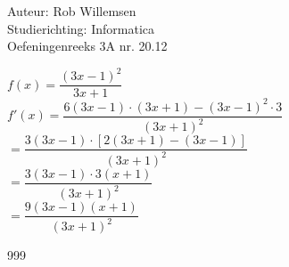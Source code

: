 \documentclass[a4paper]{article}
\begin{document}
\noindent \large Auteur: Rob Willemsen \\
\noindent \large Studierichting: Informatica\\
\noindent \large Oefeningenreeks 3A nr. 20.12\\

\medskip

\normalsize

$f(x) = \dfrac{(3x-1)^2}{3x + 1}$ \\

$f'(x) = \dfrac{6(3x-1) \cdot (3x + 1) - (3x-1)^2 \cdot 3}{(3x + 1)^2}$ \\

$= \dfrac{3(3x - 1) \cdot \left[2(3x + 1) - (3x - 1)\right]}{(3x + 1)^2}$ \\

$= \dfrac{3(3x - 1) \cdot 3(x + 1)}{(3x + 1)^2}$ \\

$= \dfrac{9(3x - 1)(x + 1)}{(3x + 1)^2}$ \\

\begin{thebibliography}{999}
\end{thebibliography}
\end{document}
